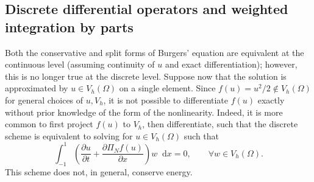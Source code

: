 \documentclass[preprint,10pt]{article}
\theoremstyle{definition}
\theoremstyle{lemma}
\theoremstyle{theorem}
\theoremstyle{assumption}
\newcommand{\pd}[2]{\frac{\partial#1}{\partial#2}}
\newcommand{\LRp}[1]{\left( #1 \right)}
\newcommand*\diff[1]{\mathop{}\!{\mathrm{d}#1}}
\begin{document}
\subsection{Discrete differential operators and weighted integration by parts}

Both the conservative and split forms of Burgers' equation are equivalent at the continuous level (assuming continuity of $u$ and exact differentiation); however, this is no longer true at the discrete level.  Suppose now that the solution is approximated by $u \in V_h(\Omega)$ on a single element.  Since $f(u) = u^2/2 \not\in V_h(\Omega)$ for general choices of $u, V_h$, it is not possible to differentiate $f(u)$ exactly without prior knowledge of the form of the nonlinearity.  Indeed, it is more common to first project $f(u)$ to $V_h$, then differentiate, such that the discrete scheme is equivalent to solving for $u \in V_h(\Omega)$ such that
\[
\int_{-1}^1 \LRp{\pd{u}{t} + \pd{\Pi_N f(u)}{x}}w \diff{x}  
=0, \qquad \forall w \in V_h(\Omega).  
\]
This scheme does not, in general, conserve energy.  %
\end{document}
